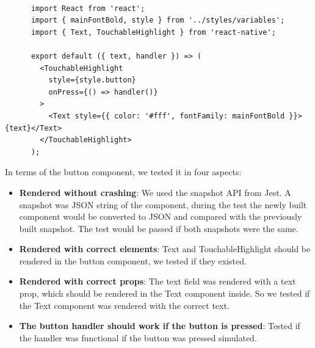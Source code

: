 \documentclass[12pt,a4paper]{article}
\begin{document}
          \begin{lstlisting}[caption=Button.jsx, label={lst:Button.jsx}]

      import React from 'react';
      import { mainFontBold, style } from '../styles/variables';
      import { Text, TouchableHighlight } from 'react-native';

      export default ({ text, handler }) => (
        <TouchableHighlight
          style={style.button}
          onPress={() => handler()}
        >
          <Text style={{ color: '#fff', fontFamily: mainFontBold }}>{text}</Text>
        </TouchableHighlight>
      );

          \end{lstlisting}
        
          In terms of the button component, we tested it in four aspects: 
          \begin{itemize}
            \setlength\itemsep{0em}
            \item{\bf Rendered without crashing}: We used the snapshot API from Jest. A snapshot was JSON string of the component, during the test the newly built component would be converted to JSON and compared with the previously built snapshot. The test would be passed if both snapshots were the same.  
            \item{\bf Rendered with correct elements}: Text and TouchableHighlight should be rendered in the button component, we tested if they existed.
            \item{\bf Rendered with correct props}: The text field was rendered with a text prop, which should be rendered in the Text component inside. So we tested if the Text component was rendered with the correct text.
            \item{\bf The button handler should work if the button is pressed}: Tested if the handler was functional if the button was pressed simulated.
          \end{itemize} 
\end{document}
